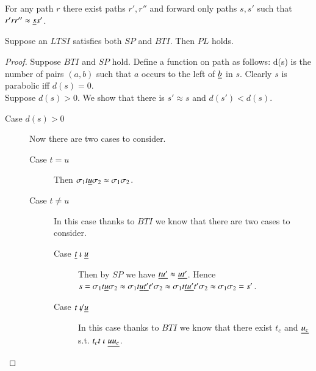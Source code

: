 

\begin{definition}
  For any path $r$ there exist paths $r',r''$ and forward only paths $s,s'$ such that $r'rr'' \approx \underline{s}s'$.
\end{definition}

\begin{proposition}
  Suppose an $LTSI$ satisfies both $SP$ and $BTI$. Then $PL$ holds.
\end{proposition}
\begin{proof}
  Suppose $BTI$ and $SP$ hold. Define a function on path as follows: d(s) is the
  number of pairs $(a,b)$ such that $a$ occurs to the left of $\underline{b}$ in $s$.
  Clearly $s$ is parabolic iff $d(s)=0$. \\

  Suppose $d(s)>0$. We show that there is $s' \approx s$ and $d(s') < d(s)$.
  \begin{description}
  \item[Case $d(s)>0$] Now there are two cases to consider.
    \begin{description}
    \item[Case $t = u$] Then $\sigma_1t\underline{u}\sigma_2 \approx
      \sigma_1\sigma_2$.
    \item[Case $t \neq u$] In this case thanks to $BTI$ we know that there are
      two cases to consider.
      \begin{description}
      \item[Case $\underline{t} \mathrel{\iota} \underline{u}$] Then by $SP$ we have $\underline{t}\underline{u'}
        \approx \underline{u}\underline{t'}$. Hence $s= \sigma_1t\underline{u}\sigma_2 \approx
        \sigma_1 t\underline{u}\underline{t'}t'\sigma_2 \approx \sigma_1
        t\underline{t}\underline{u'}t'\sigma_2 \approx \sigma_1 \sigma_2=s'$.
        
      \item[Case $t \not\mathrel{\iota} \underline{u}$] In this case thanks to $BTI$ we know that
        there exist $t_c$ and $\underline{u_c}$ s.t. $t_ct \mathrel{\iota} \underline{uu_c}$.
        
      \end{description}
    \end{description}
  \end{description}
  
\end{proof}